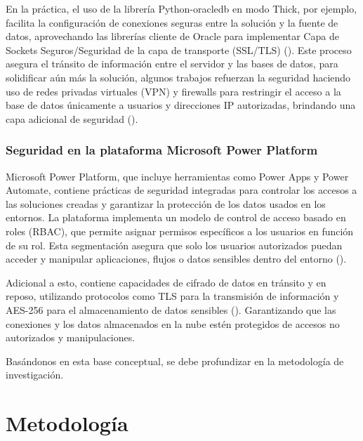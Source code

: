 \documentclass[letter,oneside,12pt,spanish]{report}
\begin{document}
\noindent En la práctica, el uso de la librería Python-oracledb en modo Thick, por ejemplo, facilita la configuración de conexiones seguras entre la solución y la fuente de datos, aprovechando las librerías cliente de Oracle para implementar Capa de Sockets Seguros/Seguridad de la capa de transporte (SSL/TLS) (\cite{oracle2024python}). Este proceso asegura el tránsito de información entre el servidor y las bases de datos, para solidificar aún más la solución, algunos trabajos refuerzan la seguridad haciendo uso de redes privadas virtuales (VPN) y firewalls para restringir el acceso a la base de datos únicamente a usuarios y direcciones IP autorizadas, brindando una capa adicional de seguridad (\cite{microsoft2024vpn}).

\subsection{Seguridad en la plataforma Microsoft Power Platform}

\noindent Microsoft Power Platform, que incluye herramientas como Power Apps y Power Automate, contiene prácticas de seguridad integradas para controlar los accesos a las soluciones creadas y garantizar la protección de los datos usados en los entornos. La plataforma implementa un modelo de control de acceso basado en roles (RBAC), que permite asignar permisos específicos a los usuarios en función de su rol. Esta segmentación asegura que solo los usuarios autorizados puedan acceder y manipular aplicaciones, flujos o datos sensibles dentro del entorno (\cite{microsoft2024securityroles}).

\noindent Adicional a esto, contiene capacidades de cifrado de datos en tránsito y en reposo, utilizando protocolos como TLS para la transmisión de información y AES-256 para el almacenamiento de datos sensibles (\cite{microsoft2024encryption}). Garantizando que las conexiones y los datos almacenados en la nube estén protegidos de accesos no autorizados y manipulaciones.

\noindent Basándonos en esta base conceptual, se debe profundizar en la metodología de investigación.


\newpage

\chapter{Metodología}
\end{document}
